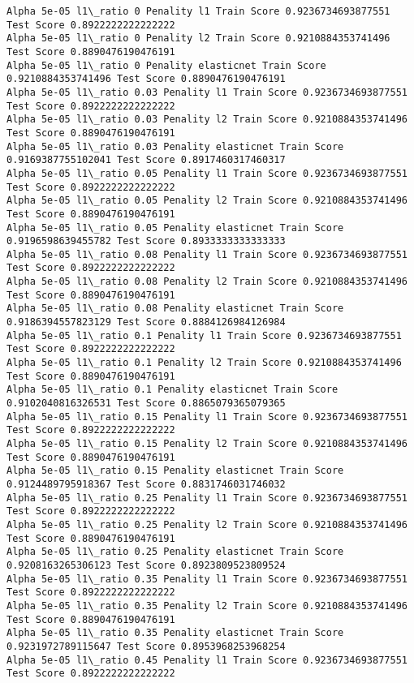 \documentclass[11pt]{article}
\begin{document}
    \begin{Verbatim}[commandchars=\\\{\}]
Alpha 5e-05 l1\_ratio 0 Penality l1 Train Score 0.9236734693877551 Test Score 0.8922222222222222
Alpha 5e-05 l1\_ratio 0 Penality l2 Train Score 0.9210884353741496 Test Score 0.8890476190476191
Alpha 5e-05 l1\_ratio 0 Penality elasticnet Train Score 0.9210884353741496 Test Score 0.8890476190476191
Alpha 5e-05 l1\_ratio 0.03 Penality l1 Train Score 0.9236734693877551 Test Score 0.8922222222222222
Alpha 5e-05 l1\_ratio 0.03 Penality l2 Train Score 0.9210884353741496 Test Score 0.8890476190476191
Alpha 5e-05 l1\_ratio 0.03 Penality elasticnet Train Score 0.9169387755102041 Test Score 0.8917460317460317
Alpha 5e-05 l1\_ratio 0.05 Penality l1 Train Score 0.9236734693877551 Test Score 0.8922222222222222
Alpha 5e-05 l1\_ratio 0.05 Penality l2 Train Score 0.9210884353741496 Test Score 0.8890476190476191
Alpha 5e-05 l1\_ratio 0.05 Penality elasticnet Train Score 0.9196598639455782 Test Score 0.8933333333333333
Alpha 5e-05 l1\_ratio 0.08 Penality l1 Train Score 0.9236734693877551 Test Score 0.8922222222222222
Alpha 5e-05 l1\_ratio 0.08 Penality l2 Train Score 0.9210884353741496 Test Score 0.8890476190476191
Alpha 5e-05 l1\_ratio 0.08 Penality elasticnet Train Score 0.9186394557823129 Test Score 0.8884126984126984
Alpha 5e-05 l1\_ratio 0.1 Penality l1 Train Score 0.9236734693877551 Test Score 0.8922222222222222
Alpha 5e-05 l1\_ratio 0.1 Penality l2 Train Score 0.9210884353741496 Test Score 0.8890476190476191
Alpha 5e-05 l1\_ratio 0.1 Penality elasticnet Train Score 0.9102040816326531 Test Score 0.8865079365079365
Alpha 5e-05 l1\_ratio 0.15 Penality l1 Train Score 0.9236734693877551 Test Score 0.8922222222222222
Alpha 5e-05 l1\_ratio 0.15 Penality l2 Train Score 0.9210884353741496 Test Score 0.8890476190476191
Alpha 5e-05 l1\_ratio 0.15 Penality elasticnet Train Score 0.9124489795918367 Test Score 0.8831746031746032
Alpha 5e-05 l1\_ratio 0.25 Penality l1 Train Score 0.9236734693877551 Test Score 0.8922222222222222
Alpha 5e-05 l1\_ratio 0.25 Penality l2 Train Score 0.9210884353741496 Test Score 0.8890476190476191
Alpha 5e-05 l1\_ratio 0.25 Penality elasticnet Train Score 0.9208163265306123 Test Score 0.8923809523809524
Alpha 5e-05 l1\_ratio 0.35 Penality l1 Train Score 0.9236734693877551 Test Score 0.8922222222222222
Alpha 5e-05 l1\_ratio 0.35 Penality l2 Train Score 0.9210884353741496 Test Score 0.8890476190476191
Alpha 5e-05 l1\_ratio 0.35 Penality elasticnet Train Score 0.9231972789115647 Test Score 0.8953968253968254
Alpha 5e-05 l1\_ratio 0.45 Penality l1 Train Score 0.9236734693877551 Test Score 0.8922222222222222

\end{Verbatim}
\end{document}
